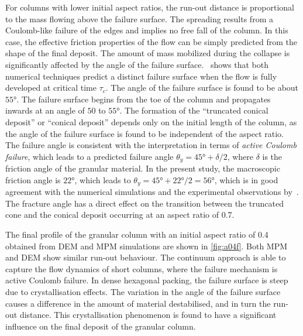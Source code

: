 For columns with lower initial aspect ratios, the run-out distance is 
proportional to the mass flowing above the failure surface. The spreading 
results from a Coulomb-like failure of the edges and implies no free fall of 
the column. In this case, the effective friction 
properties of the flow can be simply predicted from the shape of the final 
deposit. The amount of mass mobilized during the collapse is significantly 
affected by the angle of the failure surface.~ shows that both 
numerical techniques predict a distinct failure surface when the flow is fully 
developed at critical time $\tau_{\textit{c}}$. The angle of the failure 
surface is found to be about $55\si{\degree}$. The failure surface begins from 
the toe of the column and propagates inwards at an angle of $50$ to 
$55\si{\degree}$. The formation of the ``truncated conical deposit'' or 
``conical deposit'' depends only on the initial length of the column, as the 
angle of the failure surface is found to be independent of the aspect ratio. 
The failure angle is consistent with the interpretation in terms of 
\textit{active Coulomb failure}, which leads to a 
predicted failure angle $\theta_{\textit{y}}=45\si{\degree}+\delta / 2$, where 
$\delta$ is the friction angle of the granular material. In the 
present study, the macroscopic friction angle is $22\si{\degree}$, which 
leads to $\theta_{\textit{y}}=45\si{\degree}+22\si{\degree}/ 2=56\si{\degree}$, 
which is in good agreement with the numerical simulations and the experimental 
observations by~\citet{Lajeunesse2004}. The fracture angle has a 
direct effect on the transition between the truncated cone and the conical 
deposit occurring at an aspect ratio of 0.7.

The final profile of the granular column with an initial aspect ratio 
of 0.4 obtained from DEM and MPM simulations are shown in \cref{fig:a04f}. Both 
MPM and DEM show similar run-out 
behaviour. The continuum approach is able to capture the flow dynamics of short 
columns, where the failure mechanism is active Coulomb failure. In dense 
hexagonal packing, the failure surface is steep due to crystallisation effects. 
The variation in the angle of the failure surface causes a difference in the 
amount of material destabilised, and in turn the run-out distance. 
This crystallisation phenomenon is found to have a significant influence on the 
final deposit of the granular column.

